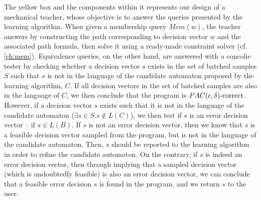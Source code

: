 The yellow box and the components within it represents our design of a mechanical teacher, whose objective is to answer the queries presented by the learning algorithm. When given a membership query $Mem(w)$, the teacher answers by constructing the path corresponding to decision vector $w$ and the associated path formula, then solve it using a ready-made constraint solver (cf. \ref{ch:mem}). Equivalence queries, on the other hand, are answered with a concolic tester by checking whether a decision vector $s$ exists in the set of batched samples $S$ such that $s$ is not in the language of the candidate automaton proposed by the learning algorithm, $C$. If all decision vectors in the set of batched samples are also in the language of $C$, we then conclude that the program is $PAC(\epsilon, \delta)\text{-correct}$. However, if a decision vector $s$ exists such that it is not in the language of the candidate automaton ($\exists s \in S. s \notin L(C)$), we then test if $s$ is an error decision vector -- if $s \in L(B)$. If $s$ is not an error decision vector, then we know that $s$ is a feasible decision vector sampled from the program, but is not in the language of the candidate automaton. Then, $s$ should be reported to the learning algorithm in order to refine the candidate automaton. On the contrary, if $s$ is indeed an error decision vector, then through implying that a sampled decision vector (which is undoubtedly feasible) is also an error decision vector, we can conclude that a feasible error decision $s$ is found in the program, and we return $s$ to the user. 
	
